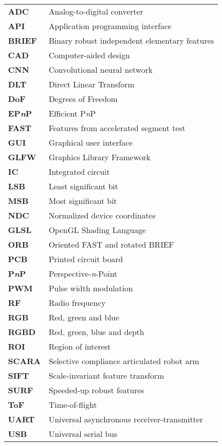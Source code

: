 \begin{tabular}{p{3cm}l}
  	\textbf{ADC}			& Analog-to-digital converter \\
  	\textbf{API}			& Application programming interface \\
  	\textbf{BRIEF}			& Binary robust independent elementary features \\
  	\textbf{CAD}			& Computer-aided design \\
	\textbf{CNN} 			& Convolutional neural network \\
	\textbf{DLT}			& Direct Linear Transform \\
	\textbf{DoF}			& Degrees of Freedom \\
	\textbf{EP\textit{n}P}	& Efficient P\textit{n}P \\
	\textbf{FAST}			& Features from accelerated segment test \\
	\textbf{GUI}			& Graphical user interface \\
	\textbf{GLFW}			& Graphics Library Framework \\
	\textbf{IC}				& Integrated circuit \\	
	\textbf{LSB}			& Least significant bit \\
	\textbf{MSB}			& Most significant bit \\
	\textbf{NDC}			& Normalized device coordinates \\
	\textbf{GLSL}			& OpenGL Shading Language \\
	\textbf{ORB}			& Oriented FAST and rotated BRIEF \\
	\textbf{PCB}			& Printed circuit board \\
	\textbf{P\textit{n}P}	& Perspective-\textit{n}-Point \\
	\textbf{PWM}			& Pulse width modulation \\
	\textbf{RF}				& Radio frequency \\
	\textbf{RGB}			& Red, green and blue \\
	\textbf{RGBD}			& Red, green, blue and depth \\
	\textbf{ROI}			& Region of interest \\
	\textbf{SCARA}			& Selective compliance articulated robot arm \\
	\textbf{SIFT}			& Scale-invariant feature transform \\
	\textbf{SURF}			& Speeded-up robust features \\
	\textbf{ToF}			& Time-of-flight \\
	\textbf{UART} 			& Universal asynchronous receiver-transmitter \\
	\textbf{USB}			& Universal serial bus
	

\end{tabular}

